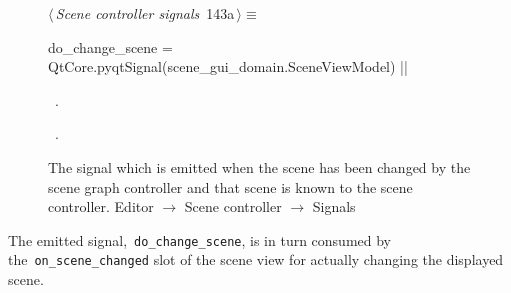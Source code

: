 \documentclass[%
    a4paper,    %
    justified,  %
    nobib,      %
    openany     %
]{tufte-book}
\makeatletter
\renewcommand{\label}[1]{\@tufte@label{##1}}%
\makeatother
\begin{document}
\begin{figure}[!htbp]
\begin{flushleft} \small
\begin{minipage}{\linewidth}\label{scrap95}\raggedright\small
{} $\langle\,${\itshape Scene controller signals}\nobreak\ {\footnotesize {143a}}$\,\rangle\equiv$
\vspace{-1ex}
\begin{pythoncode}
do_change_scene = QtCore.pyqtSignal(scene_gui_domain.SceneViewModel)
|\NWsep|
\end{pythoncode}
\vspace{1.5ex}
\footnotesize
\begin{list}{}{\setlength{\itemsep}{-\parsep}\setlength{\itemindent}{-\leftmargin}}
\item \NWtxtMacroDefBy\ .
\item \NWtxtMacroRefIn\ .

\item{}
\end{list}
\end{minipage}\vspace{4ex}
\end{flushleft}
\caption{The signal which is emitted when the scene has been changed by the
  scene graph controller and that scene is known to the scene controller.
  \newline{}\newline{}Editor $\rightarrow$ Scene controller $\rightarrow$
  Signals}
\end{figure}

The emitted signal,~\verb=do_change_scene=, is in turn consumed by
the~\verb=on_scene_changed= slot of the scene view for actually changing the
displayed scene.
\end{document}
